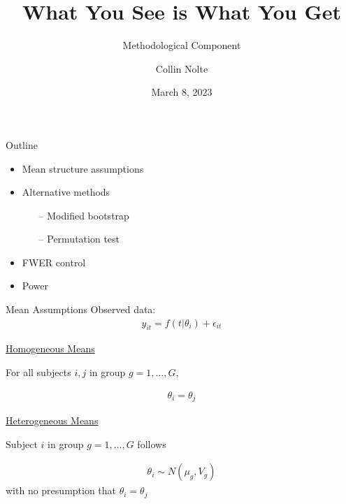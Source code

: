 \documentclass{beamer}
\title[Public Defense]{What You See is What You Get}
\subtitle{Methodological Component}
\author{Collin Nolte}
\date{March 8, 2023}
\begin{document}
\begin{frame}
  \titlepage
\end{frame}


\begin{frame}{Outline}\Large


\begin{itemize}
\item Mean structure assumptions
\item Alternative methods
  \begin{itemize}
  \item[--] Modified bootstrap
  \item[--] Permutation test
  \end{itemize}
\item FWER control
\item Power
\end{itemize}

\end{frame}

\begin{frame}{Mean Assumptions}\small
Observed data: \vspace{-2mm}
\begin{align*}
y_{it} = f(t|\theta_i) + \epsilon_{it}
\end{align*}

\underline{Homogeneous Means} \vspace{1mm}

For all subjects $i,j$ in group $g = 1, \dots, G$, \vspace{-4mm}

\begin{align*}
\theta_i = \theta_j
\end{align*}
\vspace{-4mm}


\underline{Heterogeneous Means} \vspace{1mm}

Subject $i$ in group $g = 1, \dots, G$ follows \vspace{-4mm}


\begin{align*}
\theta_i \sim N(\mu_g, V_g)
\end{align*}
\vspace{-4mm}
with no presumption that $\theta_i = \theta_j$

\end{frame}
\end{document}
